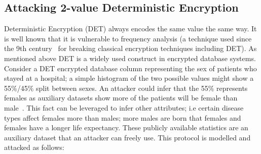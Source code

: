 \documentclass[runningheads]{llncs}
\begin{document}
\subsection{Attacking 2-value Deterministic Encryption}
Deterministic Encryption (DET) always encodes the same value the same way. It is well known that it is vulnerable to frequency analysis (a technique used since the 9th century~\cite{Arab} for breaking classical encryption techniques including DET). As mentioned above DET is a widely used construct in encrypted database systems. Consider a DET encrypted database column representing the sex of patients who stayed at a hospital; a simple histogram of the two possible values might show a 55\%/45\% split between sexes. An attacker could infer that the 55\% represents females as auxiliary datasets show more of the patients will be female than male~\cite{InfrenceAttacks}. This fact can be leveraged to infer other attributes; i.e certain disease types affect females more than males; more males are born that females and females have a longer life expectancy. These publicly available statistics are an auxiliary dataset that an attacker can freely use. This protocol is modelled and attacked as follows:
\end{document}
